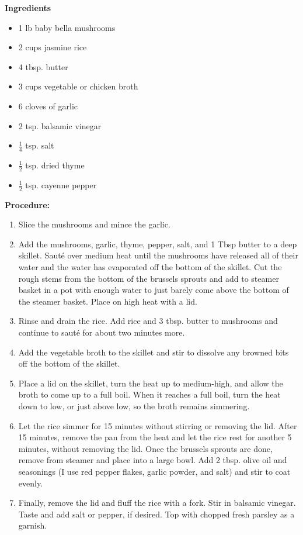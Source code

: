 \begin{multicols}{2}
\textbf{Ingredients}
\begin{itemize}
\item 1 lb baby bella mushrooms 
\item 2 cups jasmine rice
\item 4 tbsp. butter
\item 3 cups vegetable or chicken broth
\item 6 cloves of garlic
\item 2 tsp. balsamic vinegar
\item $\frac{1}{4}$ tsp. salt
\item $\frac{1}{2}$ tsp. dried thyme
\item $\frac{1}{2}$ tsp. cayenne pepper



\end{itemize}


\columnbreak
\textbf{Procedure:}
\medskip


\begin{enumerate}

\item Slice the mushrooms and mince the garlic.
\item Add the mushrooms, garlic, thyme, pepper, salt, and 1 Tbsp butter to a deep skillet. Sauté over medium heat until the mushrooms have released all of their water and the water has evaporated off the bottom of the skillet. Cut the rough stems from the bottom of the brussels sprouts and add to steamer basket in a pot with enough water to just barely come above the bottom of the steamer basket. Place on high heat with a lid. 
\item Rinse and drain the rice. Add rice and 3 tbsp. butter to mushrooms and continue to sauté for about two minutes more. 
\item Add the vegetable broth to the skillet and stir to dissolve any browned bits off the bottom of the skillet. 
\item Place a lid on the skillet, turn the heat up to medium-high, and allow the broth to come up to a full boil. When it reaches a full boil, turn the heat down to low, or just above low, so the broth remains simmering. 

\item Let the rice simmer for 15 minutes without stirring or removing the lid. After 15 minutes, remove the pan from the heat and let the rice rest for another 5 minutes, without removing the lid. Once the brussels sprouts are done, remove from steamer and place into a large bowl. Add 2 tbsp. olive oil and seasonings (I use red pepper flakes, garlic powder, and salt) and stir to coat evenly. 
\item Finally, remove the lid and fluff the rice with a fork. Stir in balsamic vinegar. Taste and add salt or pepper, if desired. Top with chopped fresh parsley as a garnish.


 
\end{enumerate}
\end{multicols}